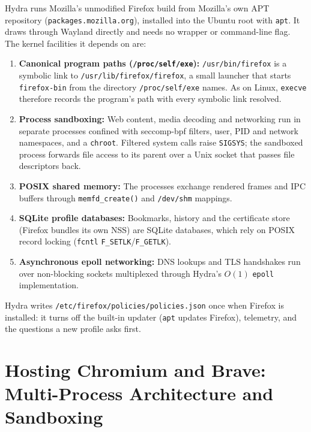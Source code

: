 Hydra runs Mozilla's unmodified Firefox build from Mozilla's own APT repository (\texttt{packages.mozilla.org}), installed into the Ubuntu root with \texttt{apt}. It draws through Wayland directly and needs no wrapper or command-line flag. The kernel facilities it depends on are:
\begin{enumerate}
    \item \textbf{Canonical program paths (\texttt{/proc/self/exe}):} \texttt{/usr/bin/firefox} is a symbolic link to \texttt{/usr/lib/firefox/firefox}, a small launcher that starts \texttt{firefox-bin} from the directory \texttt{/proc/self/exe} names. As on Linux, \texttt{execve} therefore records the program's path with every symbolic link resolved.
    \item \textbf{Process sandboxing:} Web content, media decoding and networking run in separate processes confined with seccomp-bpf filters, user, PID and network namespaces, and a \texttt{chroot}. Filtered system calls raise \texttt{SIGSYS}; the sandboxed process forwards file access to its parent over a Unix socket that passes file descriptors back.
    \item \textbf{POSIX shared memory:} The processes exchange rendered frames and IPC buffers through \texttt{memfd\_create()} and \texttt{/dev/shm} mappings.
    \item \textbf{SQLite profile databases:} Bookmarks, history and the certificate store (Firefox bundles its own NSS) are SQLite databases, which rely on POSIX record locking (\texttt{fcntl} \texttt{F\_SETLK}/\texttt{F\_GETLK}).
    \item \textbf{Asynchronous epoll networking:} DNS lookups and TLS handshakes run over non-blocking sockets multiplexed through Hydra's $O(1)$ \texttt{epoll} implementation.
\end{enumerate}

Hydra writes \texttt{/etc/firefox/policies/policies.json} once when Firefox is installed: it turns off the built-in updater (\texttt{apt} updates Firefox), telemetry, and the questions a new profile asks first.

\section{Hosting Chromium and Brave: Multi-Process Architecture and Sandboxing}
\label{sec:hosting_brave}

